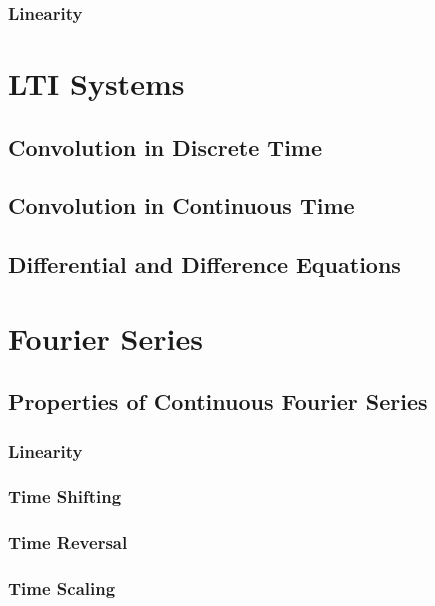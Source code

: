 \documentclass[12pt,letterpaper]{article} \usepackage{amsmath} \usepackage{graphicx} \usepackage[margin=1in]{geometry} \usepackage{longtable}  \usepackage{amssymb}
\begin{document}
	\subsubsection{Linearity}
	
	\section{LTI Systems}
	
	\subsection{Convolution in Discrete Time}
	
	\subsection{Convolution in Continuous Time}
	
	\subsection{Differential and Difference Equations}
	
	\section{Fourier Series}
	
	\subsection{Properties of Continuous Fourier Series}
	
	\subsubsection{Linearity}
	
	\subsubsection{Time Shifting}
	
	\subsubsection{Time Reversal}
	
	\subsubsection{Time Scaling}
	
\end{document}
